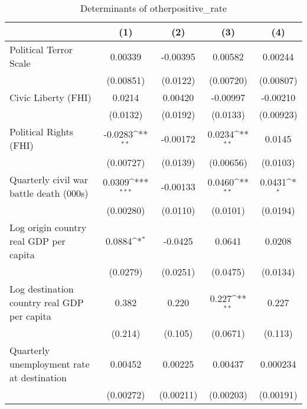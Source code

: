 \begin{table}[htbp]\centering
\def\sym#1{\ifmmode^{#1}\else\(^{#1}\)\fi}
\caption{Determinants of otherpositive\_rate}
\begin{tabular}{l*{4}{c}}
\hline\hline
                    &\multicolumn{1}{c}{(1)}         &\multicolumn{1}{c}{(2)}         &\multicolumn{1}{c}{(3)}         &\multicolumn{1}{c}{(4)}         \\
\hline
Political Terror Scale&     0.00339         &    -0.00395         &     0.00582         &     0.00244         \\
                    &   (0.00851)         &    (0.0122)         &   (0.00720)         &   (0.00807)         \\
[1em]
Civic Liberty (FHI) &      0.0214         &     0.00420         &    -0.00997         &    -0.00210         \\
                    &    (0.0132)         &    (0.0192)         &    (0.0133)         &   (0.00923)         \\
[1em]
Political Rights (FHI)&     -0.0283\sym{**} &    -0.00172         &      0.0234\sym{**} &      0.0145         \\
                    &   (0.00727)         &    (0.0139)         &   (0.00656)         &    (0.0103)         \\
[1em]
Quarterly civil war battle death (000s)&      0.0309\sym{***}&    -0.00133         &      0.0460\sym{**} &      0.0431\sym{*}  \\
                    &   (0.00280)         &    (0.0110)         &    (0.0101)         &    (0.0194)         \\
[1em]
Log origin country real GDP per capita&      0.0884\sym{*}  &     -0.0425         &      0.0641         &      0.0208         \\
                    &    (0.0279)         &    (0.0251)         &    (0.0475)         &    (0.0134)         \\
[1em]
Log destination country real GDP per capita&       0.382         &       0.220         &       0.227\sym{**} &       0.227         \\
                    &     (0.214)         &     (0.105)         &    (0.0671)         &     (0.113)         \\
[1em]
Quarterly unemployment rate at destination&     0.00452         &     0.00225         &     0.00437         &    0.000234         \\
                    &   (0.00272)         &   (0.00211)         &   (0.00203)         &   (0.00191)         \\

\end{tabular}
\end{table}
